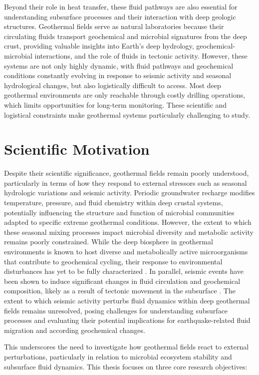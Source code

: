 Beyond their role in heat transfer, these fluid pathways are also essential for understanding subsurface processes and their interaction with deep geologic structures.
Geothermal fields serve as natural laboratories because their circulating fluids transport geochemical and microbial signatures from the deep crust, providing valuable insights into Earth's deep hydrology, geochemical-microbial interactions, and the role of fluids in tectonic activity.
However, these systems are not only highly dynamic, with fluid pathways and geochemical conditions constantly evolving in response to seismic activity and seasonal hydrological changes, but also logistically difficult to access.
Most deep geothermal environments are only reachable through costly drilling operations, which limits opportunities for long-term monitoring.
These scientific and logistical constraints make geothermal systems particularly challenging to study.

\section{Scientific Motivation}
Despite their scientific significance, geothermal fields remain poorly understood, particularly in terms of how they respond to external stressors such as seasonal hydrologic variations and seismic activity.
Periodic groundwater recharge modifies temperature, pressure, and fluid chemistry within deep crustal systems, potentially influencing the structure and function of microbial communities adapted to specific extreme geothermal conditions.
However, the extent to which these seasonal mixing processes impact microbial diversity and metabolic activity remains poorly constrained.
While the deep biosphere in geothermal environments is known to host diverse and metabolically active microorganisms that contribute to geochemical cycling, their response to environmental disturbances has yet to be fully characterized \citep{colman2017review}.
In parallel, seismic events have been shown to induce significant changes in fluid circulation and geochemical composition, likely as a result of tectonic movement in the subsurface \citep{toutain1999seismo, ide2020kumamoto, igarashi1995radon, sano2016kumamoto}.
The extent to which seismic activity perturbs fluid dynamics within deep geothermal fields remains unresolved, posing challenges for understanding subsurface processes and evaluating their potential implications for earthquake-related fluid migration and according geochemical changes.

This underscores the need to investigate how geothermal fields react to external perturbations, particularly in relation to microbial ecosystem stability and subsurface fluid dynamics.
This thesis focuses on three core research objectives:

